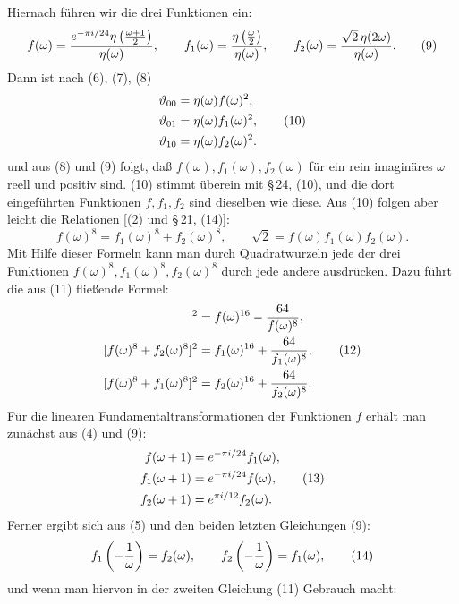 \documentclass[11pt]{article}
\providecommand{\tht}{\vartheta}
\begin{document}
Hiernach führen wir die drei Funktionen ein:
\begin{equation}
 f(\omega)={e^{-\pi i/24}\eta\left({\omega+1\over2}\right)\over\eta(\omega)},
\qquad
 f_1(\omega)={\eta\left({\omega\over2}\right)\over\eta(\omega)},
\qquad
 f_2(\omega)={\sqrt2\,\eta(2\omega)\over\eta(\omega)}. \tag{9}
\end{equation}
Dann ist nach (6), (7), (8)
\begin{align}
\tht_{00}&=\eta(\omega)f(\omega)^2,\notag\\
\tht_{01}&=\eta(\omega)f_1(\omega)^2, \tag{10}\\
\tht_{10}&=\eta(\omega)f_2(\omega)^2.\notag
\end{align}
und aus (8) und (9) folgt, daß $f(\omega),f_1(\omega),f_2(\omega)$ für ein rein imaginäres $\omega$ reell und positiv sind. (10) stimmt überein mit \S\,24, (10), und die dort eingeführten Funktionen $f,f_1,f_2$ sind dieselben wie diese. Aus (10) folgen aber leicht die Relationen [(2) und \S\,21, (14)]:
\begin{equation}
f(\omega)^8=f_1(\omega)^8+f_2(\omega)^8,
\qquad
\sqrt2=f(\omega)f_1(\omega)f_2(\omega). \tag{11}
\end{equation}
Mit Hilfe dieser Formeln kann man durch Quadratwurzeln jede der drei Funktionen $f(\omega)^8,f_1(\omega)^8,f_2(\omega)^8$ durch jede andere ausdrücken. Dazu führt die aus (11) fließende Formel:
\begin{align}
[f_1(\omega)^8-f_2(\omega)^8]^2&=f(\omega)^{16}-{64\over f(\omega)^8},\notag\\
[f(\omega)^8+f_2(\omega)^8]^2&=f_1(\omega)^{16}+{64\over f_1(\omega)^8}, \tag{12}\\
[f(\omega)^8+f_1(\omega)^8]^2&=f_2(\omega)^{16}+{64\over f_2(\omega)^8}.\notag
\end{align}
Für die linearen Fundamentaltransformationen der Funktionen $f$ erhält man zunächst aus (4) und (9):
\begin{align}
f(\omega+1)&=e^{-\pi i/24}f_1(\omega),\notag\\
f_1(\omega+1)&=e^{-\pi i/24}f(\omega), \tag{13}\\
f_2(\omega+1)&=e^{\pi i/12}f_2(\omega).\notag
\end{align}
Ferner ergibt sich aus (5) und den beiden letzten Gleichungen (9):
\begin{equation}
f_1\left(-{1\over\omega}\right)=f_2(\omega),
\qquad
f_2\left(-{1\over\omega}\right)=f_1(\omega), \tag{14}
\end{equation}
und wenn man hiervon in der zweiten Gleichung (11) Gebrauch macht:
\end{document}
